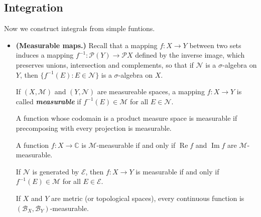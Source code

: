 \documentclass{article}
\theoremstyle{definition}
\newcommand{\C}{\mathbb{C}}
\begin{document}
		\subsection{Integration}
		Now we construct integrals from simple funtions.
		
		\begin{itemize}
			\item \textbf{(Measurable maps.)} Recall that a mapping $f:X\to Y$ between two sets induces a mapping $f^{-1}:\mathcal{P}(Y)\to\mathcal{P}X$ defined by the inverse image, which preserves unions, intersection and complements, so that if $\mathcal{N}$ is a $\sigma$-algebra on $Y$, then $\{f^{-1}(E):E\in\mathcal{N}\}$ is a $\sigma$-algebra on $X$.
			
			If $(X,\mathcal{M})$ and $(Y,\mathcal{N})$ are measureable spaces, a mapping $f:X\to Y$ is called \textbf{\textit{measurable}} if $f^{-1}(E)\in\mathcal{M}$ for all $E\in\mathcal{N}$.
			
			\begin{prop}
				A function whose codomain is a product measure space is measurable if precomposing with every projection is measurable.
			\end{prop}
			\begin{coro}
				A function $f:X\to\C$ is $\mathcal{M}$-measurable if and only if $\operatorname{Re} f$ and $\operatorname{Im} f$ are $\mathcal{M}$-measurable.
			\end{coro}
			
			\begin{prop}
				If $\mathcal{N}$ is generated by $\mathcal{E}$, then $f:X\to Y$ is measurable if and only if $f^{-1}(E)\in\mathcal{M}$ for all $E\in\mathcal{E}$.
			\end{prop}
			\begin{coro}
				If $X$ and $Y$ are metric (or topological spaces), every continuous function is $(\mathcal{B}_X,\mathcal{B}_Y)$-measurable.
			\end{coro}
			

\end{itemize}
\end{document}
